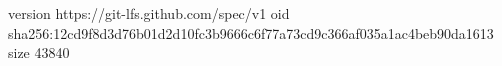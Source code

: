 version https://git-lfs.github.com/spec/v1
oid sha256:12cd9f8d3d76b01d2d10fc3b9666c6f77a73cd9c366af035a1ac4beb90da1613
size 43840
